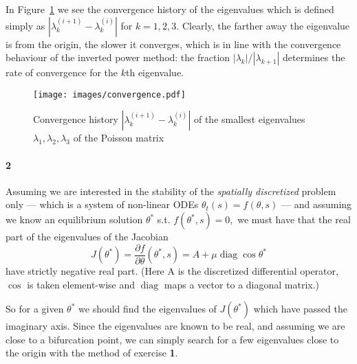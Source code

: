 \documentclass[a4paper]{article}
\DeclareMathOperator{\diag}{diag}
\begin{document}
  In Figure~\ref{fig:lambda_conv} we see the convergence history of the eigenvalues which is defined simply as $|\lambda^{(i + 1)}_k - \lambda^{(i)}_k|$ for $k = 1, 2, 3.$ Clearly, the farther away the eigenvalue is from the origin, the slower it converges, which is in line with the convergence behaviour of the inverted power method: the fraction $|\lambda_k| / |\lambda_{k+1}|$ determines the rate of convergence for the $k$th eigenvalue.

  \begin{figure}[h]
    \caption{Convergence history $|\lambda^{(i + 1)}_k - \lambda^{(i)}_k|$ of the smallest eigenvalues $\lambda_1, \lambda_2, \lambda_3$ of the Poisson matrix}\label{fig:lambda_conv}
    \centerline{\texttt{[image: images/convergence.pdf]}}
  \end{figure}

  \paragraph{2} Assuming we are interested in the stability of the \emph{spatially discretized} problem only --- which is a system of non-linear ODEs $\theta_t(s) = f(\theta, s)$ --- and assuming we know an equilibrium solution $\theta^*$ s.t. $f(\theta^*, s) = 0,$ we must have that the real part of the eigenvalues of the Jacobian $$J(\theta^*) = \frac{\partial f}{\partial \theta}(\theta^*, s) = A + \mu \diag \cos \theta^*$$ have strictly negative real part. (Here A is the discretized differential operator, $\cos$ is taken element-wise and $\diag$ maps a vector to a diagonal matrix.)

  So for a given $\theta^*$ we should find the eigenvalues of $J(\theta^*)$ which have passed the imaginary axis. Since the eigenvalues are known to be real, and assuming we are close to a bifurcation point, we can simply search for a few eigenvalues close to the origin with the method of exercise {\bf 1}.
\end{document}
